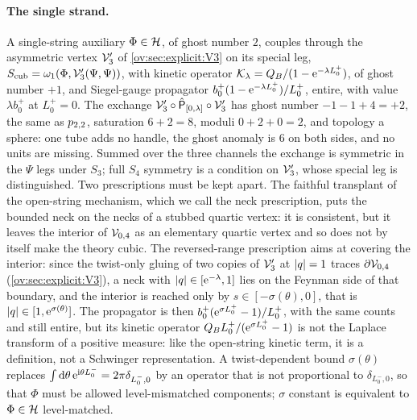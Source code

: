 \paragraph{The single strand.}
A single-string auxiliary $\Phi \in \mathcal{H}$, of ghost number $2$, couples through the asymmetric vertex ${\mathcal{V}}_3'$ of \cref{ov:sec:explicit:V3} on its special leg, $S_{\rm cub} = \omega_1(\Phi, {\mathcal{V}}_3'(\Psi, \Psi))$, with kinetic operator ${\mathcal{K}}_\lambda = Q_B / (1 - \mathrm{e}^{- \lambda L_0^+})$, of ghost number $+ 1$, and Siegel-gauge propagator $b_0^+ (1 - \mathrm{e}^{- \lambda L_0^+}) / L_0^+$, entire, with value $\lambda b_0^+$ at $L_0^+ = 0$.
The exchange ${\mathcal{V}}_3' \circ \hat{\mathsf P}_{[0, \lambda]} \circ {\mathcal{V}}_3'$ has ghost number $- 1 - 1 + 4 = + 2$, the same as $p_{2,2}$, saturation $6 + 2 = 8$, moduli $0 + 2 + 0 = 2$, and topology a sphere: one tube adds no handle, the ghost anomaly is $6$ on both sides, and no units are missing.
Summed over the three channels the exchange is symmetric in the $\Psi$ legs under $S_3$; full $S_4$ symmetry is a condition on ${\mathcal{V}}_3'$, whose special leg is distinguished.
Two prescriptions must be kept apart.
The faithful transplant of the open-string mechanism, which we call the neck prescription, puts the bounded neck on the necks of a stubbed quartic vertex: it is consistent, but it leaves the interior of ${\mathcal{V}}_{0, 4}$ as an elementary quartic vertex and so does not by itself make the theory cubic.
The reversed-range prescription aims at covering the interior: since the twist-only gluing of two copies of ${\mathcal{V}}_3'$ at ${|q|} = 1$ traces $\partial {\mathcal{V}}_{0, 4}$ (\cref{ov:sec:explicit:V3}), a neck with ${|q|} \in [\mathrm{e}^{- \lambda}, 1]$ lies on the Feynman side of that boundary, and the interior is reached only by $s \in [- \sigma(\theta), 0]$, that is ${|q|} \in [1, \mathrm{e}^{\sigma(\theta)}]$.
The propagator is then $b_0^+ (\mathrm{e}^{\sigma L_0^+} - 1) / L_0^+$, with the same counts and still entire, but its kinetic operator $Q_B L_0^+ / (\mathrm{e}^{\sigma L_0^+} - 1)$ is not the Laplace transform of a positive measure: like the open-string kinetic term, it is a definition, not a Schwinger representation.
A twist-dependent bound $\sigma(\theta)$ replaces $\int \mathrm{d} \theta \, \mathrm{e}^{\mathrm{i} \theta L_0^-} = 2 \pi \delta_{L_0^-, 0}$ by an operator that is not proportional to $\delta_{L_0^-, 0}$, so that $\Phi$ must be allowed level-mismatched components; $\sigma$ constant is equivalent to $\Phi \in \mathcal{H}$ level-matched.

